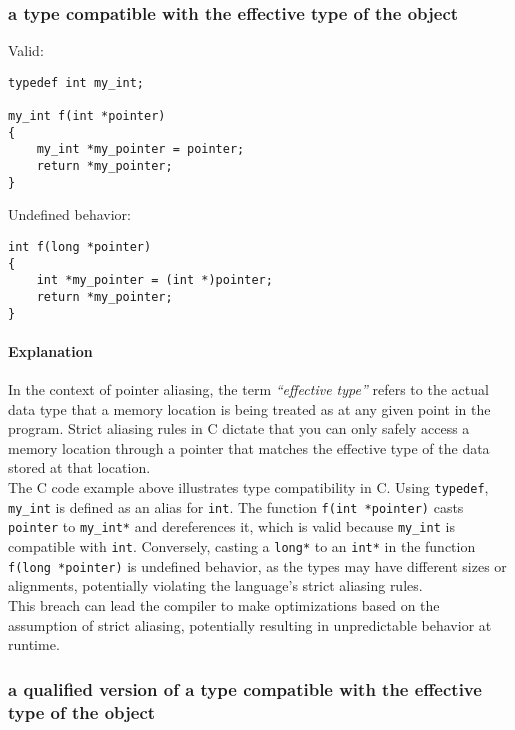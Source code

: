 \documentclass[12pt]{article}
\begin{document}
\subsubsection{a type compatible with the effective type of the object}

Valid:

\begin{lstlisting}
typedef int my_int;

my_int f(int *pointer)
{
    my_int *my_pointer = pointer;
    return *my_pointer;
}
\end{lstlisting}

Undefined behavior:

\begin{lstlisting}
int f(long *pointer)
{
    int *my_pointer = (int *)pointer;
    return *my_pointer;
}
\end{lstlisting}

\paragraph{Explanation}

In the context of pointer aliasing, the term \textit{``effective type''} refers to the actual data type that a memory location is being treated as at any given point in the program. Strict aliasing rules in C dictate that you can only safely access a memory location through a pointer that matches the effective type of the data stored at that location.\\

The C code example above illustrates type compatibility in C. Using \texttt{typedef}, \texttt{my\_int} is defined as an alias for \texttt{int}. The function \texttt{f(int *pointer)} casts \texttt{pointer} to \texttt{my\_int*} and dereferences it, which is valid because \texttt{my\_int} is compatible with \texttt{int}. Conversely, casting a \texttt{long*} to an \texttt{int*} in the function \texttt{f(long *pointer)} is undefined behavior, as the types may have different sizes or alignments, potentially violating the language's strict aliasing rules.\\
This breach can lead the compiler to make optimizations based on the assumption of strict aliasing, potentially resulting in unpredictable behavior at runtime.


\subsubsection{a qualified version of a type compatible with the effective type of the object}
\end{document}
